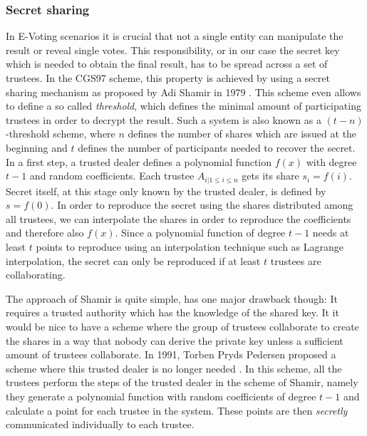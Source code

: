 \documentclass[numbers=noenddot, abstract=on, a4paper, headsepline,
footsepline, oneside, draft=off]{scrreprt}
\begin{document}
\subsubsection{Secret sharing}
\label{sec:secretsharing}
In E-Voting scenarios it is crucial that not a
single entity can manipulate the result or reveal single votes. This
responsibility, or in our case the secret key which is needed to obtain the
final result, has to be spread across a set of trustees. In the CGS97 scheme,
this property is achieved by using a secret sharing mechanism as proposed by Adi
Shamir in 1979 \cite{Shamir79}. This scheme even allows to define a so called
\textit{threshold}, which defines the minimal amount of participating trustees
in order to decrypt the result. Such a system is also known as a
$(t-n)$-threshold scheme, where $n$ defines the number of shares which are
issued at the beginning and $t$ defines the number of participants needed to
recover the secret. In a first step, a trusted dealer defines a polynomial
function $f(x)$ with degree $t-1$ and random coefficients. Each trustee $A_{i |
1 \leq i \leq n}$ gets its share $s_i=f(i)$. Secret itself, at this stage only
known by the trusted dealer, is defined by $s=f(0)$. In order to reproduce the
secret using the shares distributed among all trustees, we can interpolate the
shares in order to reproduce the coefficients and therefore also $f(x)$. Since a
polynomial function of degree $t-1$ needs at least $t$ points to reproduce using
an interpolation technique such as Lagrange interpolation, the secret can only
be reproduced if at least $t$ trustees are collaborating. 

The approach of Shamir is quite simple, has one major drawback though: It
requires a trusted authority which has the knowledge of the shared key. It it
would be nice to have a scheme where the group of trustees collaborate to create
the shares in a way that nobody can derive the private key unless a sufficient
amount of trustees collaborate. In 1991, Torben Pryds Pedersen proposed a scheme
where this trusted dealer is no longer needed \cite{PED91}. In this scheme, all the
trustees perform the steps of the trusted dealer in the scheme of Shamir, namely
they generate a polynomial function with random coefficients of degree $t-1$ and
calculate a point for each trustee in the system. These points are then
\textit{secretly} communicated individually to each trustee.
\end{document}
